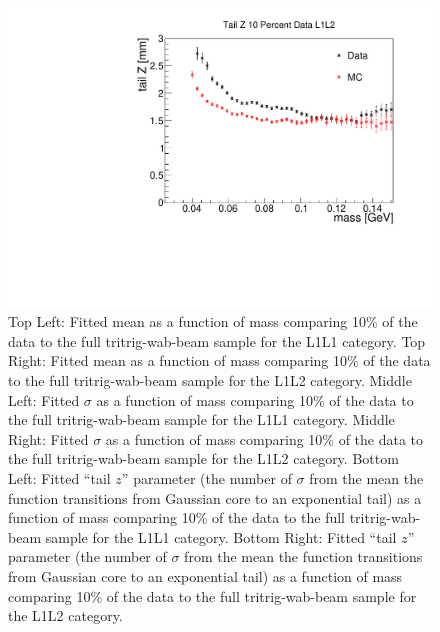 \begin{figure}[t]
    \includegraphics[width=.45\textwidth]{figs/Results/tailz_L1L2.pdf}
    \caption{Top Left: Fitted mean as a function of mass comparing 10\% of the data to the full tritrig-wab-beam sample for the L1L1 category. Top Right: Fitted mean as a function of mass comparing 10\% of the data to the full tritrig-wab-beam sample for the L1L2 category. Middle Left: Fitted $\sigma$ as a function of mass comparing 10\% of the data to the full tritrig-wab-beam sample for the L1L1 category. Middle Right: Fitted $\sigma$ as a function of mass comparing 10\% of the data to the full tritrig-wab-beam sample for the L1L2 category. Bottom Left: Fitted ``tail $z$'' parameter (the number of $\sigma$ from the mean the function transitions from Gaussian core to an exponential tail) as a function of mass comparing 10\% of the data to the full tritrig-wab-beam sample for the L1L1 category. Bottom Right: Fitted ``tail $z$'' parameter (the number of $\sigma$ from the mean the function transitions from Gaussian core to an exponential tail) as a function of mass comparing 10\% of the data to the full tritrig-wab-beam sample for the L1L2 category.}
    \label{fig:mass_slice}
\end{figure}



